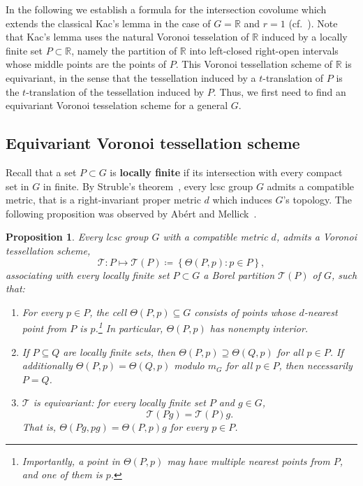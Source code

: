 \documentclass{amsart}
\numberwithin{equation}{subsection}
\newtheorem{prop}[thm]{Proposition}
\theoremstyle{remark}
\begin{document}
In the following we establish a formula for the intersection covolume which extends the classical Kac's lemma in the case of \(G=\mathbb{R}\) and \(r=1\) (cf.~\cite{meyerovitch2024}). Note that Kac's lemma uses the natural Voronoi tesselation of \(\mathbb{R}\) induced by a locally finite set \(P\subset\mathbb{R}\), namely the partition of \(\mathbb{R}\) into left-closed right-open intervals whose middle points are the points of \(P\). This Voronoi tessellation scheme of \(\mathbb{R}\) is equivariant, in the sense that the tessellation induced by a \(t\)-translation of \(P\) is the \(t\)-translation of the tessellation induced by \(P\). Thus, we first need to find an equivariant Voronoi tesselation scheme for a general \(G\).

\subsection{Equivariant Voronoi tessellation scheme}\label{sct:voronoi}

Recall that a set \(P\subset G\) is {\bf locally finite} if its intersection with every compact set in \(G\) in finite. By Struble's theorem~\cite{Struble1974}, every lcsc group \(G\) admits a compatible metric, that is a right-invariant proper metric \(d\) which induces \(G\)'s topology. The following proposition was observed by Ab\'{e}rt and Mellick~\cite[\S3.3]{abert2022point}.

\begin{prop}\label{prop:voronoi}
Every lcsc group \(G\) with a compatible metric \(d\), admits a Voronoi tessellation scheme,
\[\mathscr{T}:P\mapsto\mathscr{T}\left(P\right)\coloneqq \left\{\Theta\left(P,p\right): p\in P\right\},\]
associating with every locally finite set \(P\subset G\) a Borel partition \(\mathscr{T}\left(P\right)\) of \(G\), such that:
\begin{enumerate}
    \item For every \(p\in P\), the cell \(\Theta\left(P,p\right)\subseteq G\) consists of points whose \(d\)-nearest point from \(P\) is \(p\).\footnote{Importantly, a point in \(\Theta\left(P,p\right)\) may have multiple nearest points from \(P\), and one of them is \(p\).} In particular, \(\Theta\left(P,p\right)\) has nonempty interior.
    \item If \(P\subseteq Q\) are locally finite sets, then \(\Theta\left(P,p\right)\supseteq\Theta\left(Q,p\right)\) for all \(p\in P\). If additionally \(\Theta\left(P,p\right)=\Theta\left(Q,p\right)\) modulo \(m_{G}\) for all \(p\in P\), then necessarily \(P=Q\).
    \item \(\mathscr{T}\) is equivariant: for every locally finite set \(P\) and \(g\in G\),
    \[\mathscr{T}\left(Pg\right)=\mathscr{T}\left(P\right)g.\]
    That is, \(\Theta\left(Pg,pg\right)=\Theta\left(P,p\right)g\) for every \(p\in P\).
\end{enumerate}
\end{prop}
\end{document}
